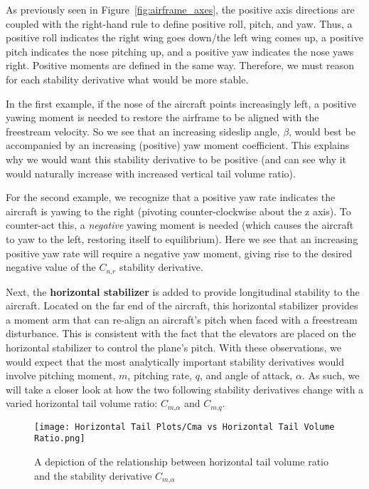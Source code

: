 \documentclass{article}
\begin{document}
As previously seen in Figure~\ref{fig:airframe_axes}, the positive axis directions are coupled with the right-hand rule to define positive roll, pitch, and yaw.
Thus, a positive roll indicates the right wing goes down/the left wing comes up, a positive pitch indicates the nose pitching up, and a positive yaw indicates the nose yaws right.
Positive moments are defined in the same way. Therefore, we must reason for each stability derivative what would be more stable.

In the first example, if the nose of the aircraft points increasingly left, a positive yawing moment is needed to restore the airframe to be aligned with the freestream velocity.
So we see that an increasing sideslip angle, $\beta$, would best be accompanied by an increasing (positive) yaw moment coefficient. This explains why we would want this stability derivative to be positive (and can see why it would naturally increase with increased vertical tail volume ratio).

For the second example, we recognize that a positive yaw rate indicates the aircraft is yawing to the right (pivoting counter-clockwise about the z axis). To counter-act this, a \textit{negative} yawing moment is needed (which causes the aircraft to yaw to the left, restoring itself to equilibrium).
Here we see that an increasing positive yaw rate will require a negative yaw moment, giving rise to the desired negative value of the $C_{n\text{,}r}$ stability derivative.

\bigskip

Next, the \textbf{horizontal stabilizer} is added to provide longitudinal stability to the aircraft.
Located on the far end of the aircraft, this horizontal stabilizer provides a moment arm that can re-align an aircraft's pitch when faced with a freestream disturbance.
This is consistent with the fact that the elevators are placed on the horizontal stabilizer to control the plane's pitch.
With these observations, we would expect that the most analytically important stability derivatives would involve pitching moment, $m$, pitching rate, $q$, and angle of attack, $\alpha$. 
As such, we will take a closer look at how the two following stability derivatives change with a varied horizontal tail volume ratio: $C_{m\text{,}\alpha}$ and $C_{m\text{,}q}$.

\begin{figure}[H]
    \centering
    \texttt{[image: Horizontal Tail Plots/Cma vs Horizontal Tail Volume Ratio.png]}
    \caption{A depiction of the relationship between horizontal tail volume ratio and the stability derivative $C_{m \text{,} \alpha}$\label{fig:Cma}}
\end{figure}
\end{document}
